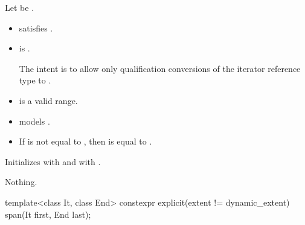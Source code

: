 \begin{itemdescr}
\pnum
\constraints
Let  be .
\begin{itemize}
\item {} satisfies .
\item
{} is .
\begin{note}
The intent is to allow only qualification conversions
of the iterator reference type to .
\end{note}
\end{itemize}

\pnum
\expects
\begin{itemize}
\item {} is a valid range.
\item {} models .
\item
If  is not equal to ,
then  is equal to .
\end{itemize}

\pnum
\effects
Initializes  with  and
 with .

\pnum
\throws
Nothing.
\end{itemdescr}

%
\begin{itemdecl}
template<class It, class End>
  constexpr explicit(extent != dynamic_extent) span(It first, End last);
\end{itemdecl}

